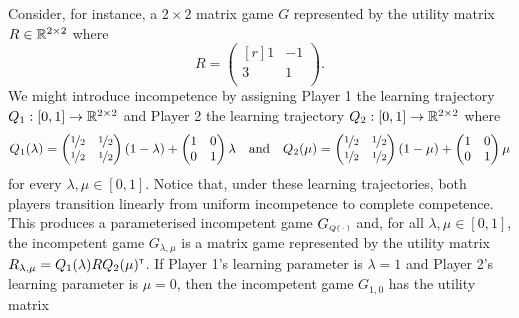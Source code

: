     Consider, for instance, a $2 \times 2$ matrix game $G$ represented by the utility matrix $R \in \mathbb{R}^{2 \times 2}$ where
    \[
        R
            =
            \begin{pmatrix*}[r]
                1 & -1 \\
                3 & 1 \\
            \end{pmatrix*}.
    \]
    We might introduce incompetence by assigning Player 1 the learning trajectory $Q_1 : [0, 1] \to \mathbb{R}^{2 \times 2}$ and Player 2 the learning trajectory $Q_2 : [0, 1] \to \mathbb{R}^{2 \times 2}$ where
    \[
        Q_1(\lambda)
            =
            \begin{pmatrix}
                \nicefrac{1}{2} & \nicefrac{1}{2} \\
                \nicefrac{1}{2} & \nicefrac{1}{2}
            \end{pmatrix}
            (1 - \lambda)
            +
            \begin{pmatrix}
                1 & 0 \\
                0 & 1 \\
            \end{pmatrix}
            \lambda
        \quad\text{and}\quad
        Q_2(\mu)
            =
            \begin{pmatrix}
                \nicefrac{1}{2} & \nicefrac{1}{2} \\
                \nicefrac{1}{2} & \nicefrac{1}{2}
            \end{pmatrix}
            (1 - \mu)
            +
            \begin{pmatrix}
                1 & 0 \\
                0 & 1 \\
            \end{pmatrix}
            \mu
    \]
    for every $\lambda, \mu \in [0, 1]$.
    Notice that, under these learning trajectories, both players transition linearly from uniform incompetence to complete competence.
    This produces a parameterised incompetent game $G_\ms{Q(\funcdot)}$ and, for all $\lambda, \mu \in [0, 1]$, the incompetent game $G_{\lambda, \mu}$ is a matrix game represented by the utility matrix $R_{\lambda, \mu} = Q_1(\lambda) R Q_2(\mu)^{\scriptscriptstyle \mathsf{T}}$.
    If Player 1's learning parameter is $\lambda = 1$ and Player 2's learning parameter is $\mu = 0$, then the incompetent game $G_{1, 0}$ has the utility matrix
